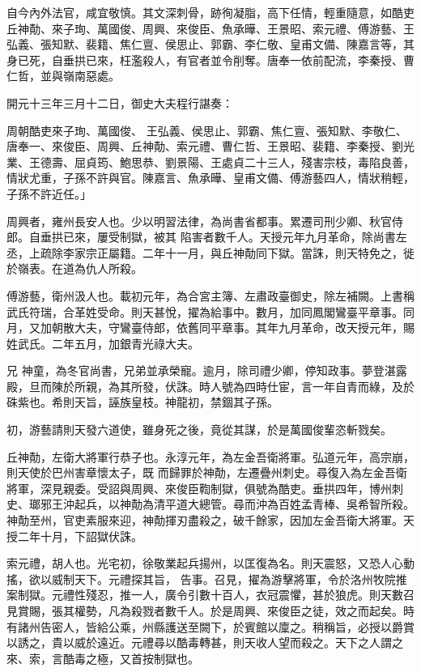 \begin{pinyinscope}
 自今內外法官，咸宜敬慎。其文深刺骨，跡徇凝脂，高下任情，輕重隨意，如酷吏丘神勣、來子珣、萬國俊、周興、來俊臣、魚承曄、王景昭、索元禮、傅游藝、王弘義、張知默、裴籍、焦仁亶、侯思止、郭霸、李仁敬、皇甫文備、陳嘉言等，其身已死，自垂拱已來，枉濫殺人，有官者並令削奪。唐奉一依前配流，李秦授、曹仁哲，並與嶺南惡處。



 開元十三年三月十二日，御史大夫程行諶奏：



 周朝酷吏來子珣、萬國俊、
 王弘義、侯思止、郭霸、焦仁亶、張知默、李敬仁、唐奉一、來俊臣、周興、丘神勣、索元禮、曹仁哲、王景昭、裴籍、李秦授、劉光業、王德壽、屈貞筠、鮑思恭、劉景陽、王處貞二十三人，殘害宗枝，毒陷良善，情狀尤重，子孫不許與官。陳嘉言、魚承曄、皇甫文備、傅游藝四人，情狀稍輕，子孫不許近任。」



 周興者，雍州長安人也。少以明習法律，為尚書省都事。累遷司刑少卿、秋官侍郎。自垂拱已來，屢受制獄，被其
 陷害者數千人。天授元年九月革命，除尚書左丞，上疏除李家宗正屬籍。二年十一月，與丘神勣同下獄。當誅，則天特免之，徙於嶺表。在道為仇人所殺。



 傅游藝，衛州汲人也。載初元年，為合宮主簿、左肅政臺御史，除左補闕。上書稱武氏符瑞，合革姓受命。則天甚悅，擢為給事中。數月，加同鳳閣鸞臺平章事。同月，又加朝散大夫，守鸞臺侍郎，依舊同平章事。其年九月革命，改天授元年，賜姓武氏。二年五月，加銀青光祿大夫。



 兄
 神童，為冬官尚書，兄弟並承榮寵。逾月，除司禮少卿，停知政事。夢登湛露殿，旦而陳於所親，為其所發，伏誅。時人號為四時仕宦，言一年自青而綠，及於硃紫也。希則天旨，誣族皇枝。神龍初，禁錮其子孫。



 初，游藝請則天發六道使，雖身死之後，竟從其謀，於是萬國俊輩恣斬戮矣。



 丘神勣，左衛大將軍行恭子也。永淳元年，為左金吾衛將軍。弘道元年，高宗崩，則天使於巴州害章懷太子，既
 而歸罪於神勣，左遷疊州刺史。尋復入為左金吾衛將軍，深見親委。受詔與周興、來俊臣鞫制獄，俱號為酷吏。垂拱四年，博州刺史、瑯邪王沖起兵，以神勣為清平道大總管。尋而沖為百姓孟青棒、吳希智所殺。神勣至州，官吏素服來迎，神勣揮刃盡殺之，破千餘家，因加左金吾衛大將軍。天授二年十月，下詔獄伏誅。



 索元禮，胡人也。光宅初，徐敬業起兵揚州，以匡復為名。則天震怒，又恐人心動搖，欲以威制天下。元禮探其旨，
 告事。召見，擢為游擊將軍，令於洛州牧院推案制獄。元禮性殘忍，推一人，廣令引數十百人，衣冠震懼，甚於狼虎。則天數召見賞賜，張其權勢，凡為殺戮者數千人。於是周興、來俊臣之徒，效之而起矣。時有諸州告密人，皆給公乘，州縣護送至闕下，於賓館以廩之。稍稱旨，必授以爵賞以誘之，貴以威於遠近。元禮尋以酷毒轉甚，則天收人望而殺之。天下之人謂之來、索，言酷毒之極，又首按制獄也。




\end{pinyinscope}
